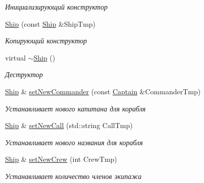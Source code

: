 \begin{DoxyCompactItemize}
\begin{DoxyCompactList}\small\item\em Инициализирующий конструктор \end{DoxyCompactList}\item 
\mbox{\hyperlink{class_aircraft_carrier_group_1_1_ship_a55e9efaf784cdecbdd271bdda777fc21}{Ship}} (const \mbox{\hyperlink{class_aircraft_carrier_group_1_1_ship}{Ship}} \&Ship\+Tmp)
\begin{DoxyCompactList}\small\item\em Копирующий конструктор \end{DoxyCompactList}\item 
\mbox{\label{class_aircraft_carrier_group_1_1_ship_acaa37cfea97f85bcf16221262aca593c}} 
virtual \mbox{\hyperlink{class_aircraft_carrier_group_1_1_ship_acaa37cfea97f85bcf16221262aca593c}{$\sim$\+Ship}} ()
\begin{DoxyCompactList}\small\item\em Деструктор \end{DoxyCompactList}\item 
\mbox{\hyperlink{class_aircraft_carrier_group_1_1_ship}{Ship}} \& \mbox{\hyperlink{class_aircraft_carrier_group_1_1_ship_a9122d6ab9856112fbffed3c5545be8d9}{set\+New\+Commander}} (const \mbox{\hyperlink{struct_aircraft_carrier_group_1_1_captain}{Captain}} \&Commander\+Tmp)
\begin{DoxyCompactList}\small\item\em Устанавливает нового капитана для корабля \end{DoxyCompactList}\item 
\mbox{\hyperlink{class_aircraft_carrier_group_1_1_ship}{Ship}} \& \mbox{\hyperlink{class_aircraft_carrier_group_1_1_ship_a67d7642e2a6cf16ce87299f701bf98f7}{set\+New\+Call}} (std\+::string Call\+Tmp)
\begin{DoxyCompactList}\small\item\em Устанавливает нового названия для корабля \end{DoxyCompactList}\item 
\mbox{\hyperlink{class_aircraft_carrier_group_1_1_ship}{Ship}} \& \mbox{\hyperlink{class_aircraft_carrier_group_1_1_ship_aa1e00421319d3a35948f899d33d4bc06}{set\+New\+Crew}} (int Crew\+Tmp)
\begin{DoxyCompactList}\small\item\em Устанавливает количество членов экипажа \end{DoxyCompactList}\item 

\end{DoxyCompactItemize}
